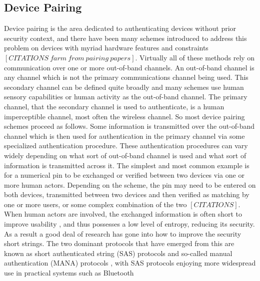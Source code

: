 \documentclass[12pt]{report}
\begin{document}
\subsection{Device Pairing}
Device pairing is the area dedicated to authenticating devices without prior security context, and there have been many schemes introduced to address this problem on devices with myriad hardware features and constraints $[CITATIONS \: farm \: from \: pairing \: papers]$. Virtually all of these methods rely on communication over one or more out-of-band channels. An out-of-band channel is any channel which is not the primary communications channel being used. This secondary channel can be defined quite broadly and many schemes use human sensory capabilities or human activity as the out-of-band channel. The primary channel, that the secondary channel is used to authenticate, is a human imperceptible channel, most often the wireless channel. So most device pairing schemes proceed as follows. Some information is transmitted over the out-of-band channel which is then used for authentication in the primary channel via some specialized authentication procedure. These authentication procedures can vary widely depending on what sort of out-of-band channel is used and what sort of information is transmitted across it. The simplest and most common example is for a numerical pin to be exchanged or verified between two devices via one or more human actors. Depending on the scheme, the pin may need to be entered on both devices, transmitted between two devices and then verified as matching by one or more users, or some complex combination of the two $[CITATIONS]$. When human actors are involved, the exchanged information is often short to improve usability \cite{BluetoothInterfaceFlowSecureSimplePairing2007}, and thus possesses a low level of entropy, reducing its security. As a result a good deal of research has gone into how to improve the security short strings. The two dominant protocols that have emerged from this are known as short authenticated string (SAS) protocols \cite{SASVaudenay2005} and so-called manual authentication (MANA) protocols \cite{ManaGehrmann2004}, with SAS protocols enjoying more widespread use in practical systems such as Bluetooth \cite{Bluetooth40Spec2010} \par
\end{document}
